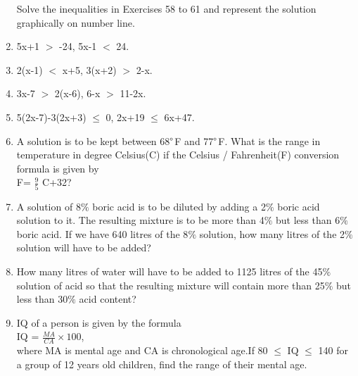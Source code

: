 \begin{enumerate}[label=\arabic*.,ref=\thesubsection.\theenumi]
Solve the inequalities in Exercises 58 to 61 and represent the solution graphically on number line. 
    \item 5x+1 $>$ -24, 5x-1 $<$ 24.\\
    \item 2(x-1) $<$ x+5, 3(x+2) $>$ 2-x.\\
    \item 3x-7 $>$ 2(x-6), 6-x $>$ 11-2x.\\
    \item 5(2x-7)-3(2x+3) $\leq$ 0, 2x+19 $\leq$ 6x+47.\\
    \item A solution is to be kept between 68$\degree$F and 77$\degree$F. What is the range in temperature in degree Celsius(C) if the Celsius / Fahrenheit(F) conversion formula is given by\\
    F= $\frac{9}{5}$ C+32?\\
    \item A solution of 8$\%$ boric acid is to be diluted by adding a 2$\%$ boric acid solution to
it. The resulting mixture is to be more than 4$\%$ but less than 6$\%$ boric acid. If we have
640 litres of the 8$\%$ solution, how many litres of the 2$\%$ solution will have to be added?\\
    \item How many litres of water will have to be added to 1125 litres of the 45$\%$ solution
of acid so that the resulting mixture will contain more than 25$\%$ but less than 30$\%$ acid
content?\\
    \item IQ of a person is given by the formula\\
            IQ = $\frac{MA}{CA}\times 100$,\\
    where MA is mental age and CA is chronological age.If 80 $\leq$ IQ $\leq$ 140 for a group of
12 years old children, find the range of their mental age.
    
    \end{enumerate}
